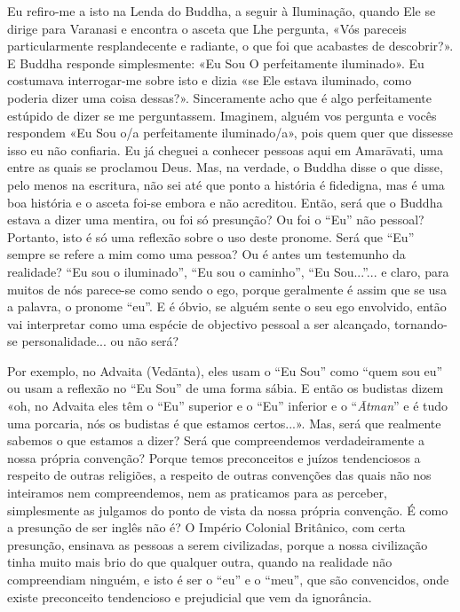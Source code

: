 Eu refiro-me a isto na Lenda do Buddha, a seguir à Iluminação, quando
Ele se dirige para Varanasi e encontra o asceta que Lhe pergunta, «Vós
pareceis particularmente resplandecente e radiante, o que foi que
acabastes de descobrir?». E Buddha responde simplesmente: «Eu Sou O
perfeitamente iluminado». Eu costumava interrogar-me sobre isto e dizia
«se Ele estava iluminado, como poderia dizer uma coisa dessas?».
Sinceramente acho que é algo perfeitamente estúpido de dizer se me
perguntassem. Imaginem, alguém vos pergunta e vocês respondem «Eu Sou
o/a perfeitamente iluminado/a», pois quem quer que dissesse isso eu não
confiaria. Eu já cheguei a conhecer pessoas aqui em Amarāvati, uma entre
as quais se proclamou Deus. Mas, na verdade, o Buddha disse o que disse,
pelo menos na escritura, não sei até que ponto a história é fidedigna,
mas é uma boa história e o asceta foi-se embora e não acreditou. Então,
será que o Buddha estava a dizer uma mentira, ou foi só presunção? Ou
foi o ``Eu'' não pessoal? Portanto, isto é só uma reflexão sobre o uso
deste pronome. Será que ``Eu'' sempre se refere a mim como uma pessoa?
Ou é antes um testemunho da realidade? ``Eu sou o iluminado'', ``Eu sou
o caminho'', ``Eu Sou...''... e claro, para muitos de nós parece-se como
sendo o ego, porque geralmente é assim que se usa a palavra, o pronome
``eu''. E é óbvio, se alguém sente o seu ego envolvido, então vai
interpretar como uma espécie de objectivo pessoal a ser alcançado,
tornando-se personalidade... ou não será?

Por exemplo, no Advaita (Vedānta), eles usam o ``Eu Sou'' como ``quem
sou eu'' ou usam a reflexão no ``Eu Sou'' de uma forma sábia. E então os
budistas dizem «oh, no Advaita eles têm o ``Eu'' superior e o ``Eu''
inferior e o ``\emph{Ātman}'' e é tudo uma porcaria, nós os budistas é
que estamos certos...». Mas, será que realmente sabemos o que estamos a
dizer? Será que compreendemos verdadeiramente a nossa própria convenção?
Porque temos preconceitos e juízos tendenciosos a respeito de outras
religiões, a respeito de outras convenções das quais não nos inteiramos
nem compreendemos, nem as praticamos para as perceber, simplesmente as
julgamos do ponto de vista da nossa própria convenção. É como a
presunção de ser inglês não é? O Império Colonial Britânico, com certa
presunção, ensinava as pessoas a serem civilizadas, porque a nossa
civilização tinha muito mais brio do que qualquer outra, quando na
realidade não compreendiam ninguém, e isto é ser o ``eu'' e o ``meu'',
que são convencidos, onde existe preconceito tendencioso e prejudicial
que vem da ignorância.

